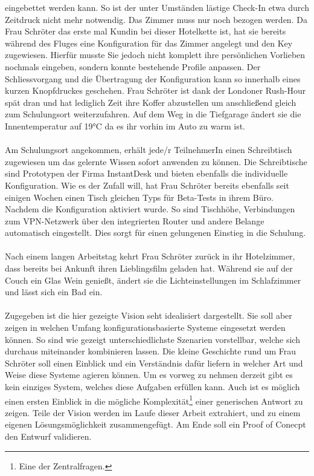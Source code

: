 eingebettet werden kann. So ist der unter Umständen lästige Check-In etwa durch Zeitdruck nicht mehr notwendig. Das Zimmer muss nur noch bezogen werden. Da Frau Schröter das
erste mal Kundin bei dieser Hotelkette ist, hat sie bereits während des Fluges eine Konfiguration für das Zimmer angelegt und den Key zugewiesen. Hierfür musste Sie jedoch 
nicht komplett ihre persönlichen Vorlieben nochmals eingeben, sondern konnte bestehende Profile anpassen. Der Schliessvorgang und die Übertragung der Konfiguration kann so 
innerhalb eines kurzen Knopfdruckes geschehen. Frau Schröter ist dank der Londoner Rush-Hour spät dran und hat lediglich Zeit ihre Koffer abzustellen um anschließend gleich
zum Schulungsort weiterzufahren. Auf dem Weg in die Tiefgarage ändert sie die Innentemperatur auf 19°C da es ihr vorhin im Auto zu warm ist. 
\\\\
Am Schulungsort angekommen, erhält jede/r TeilnehmerIn einen Schreibtisch zugewiesen um das gelernte Wissen sofort anwenden zu können. Die Schreibtische sind Prototypen der
Firma InstantDesk und bieten ebenfalls die individuelle Konfiguration. Wie es der Zufall will, hat Frau Schröter bereits ebenfalls seit einigen Wochen einen Tisch gleichen
Typs für Beta-Tests in ihrem Büro. Nachdem die Konfiguration aktiviert wurde. So sind Tischhöhe, Verbindungen zum VPN-Netzwerk über den integrierten Router und andere 
Belange automatisch eingestellt. Dies sorgt für einen gelungenen Einstieg in die Schulung. 
\\\\
Nach einem langen Arbeitstag kehrt Frau Schröter zurück in ihr Hotelzimmer, dass bereits bei Ankunft ihren Lieblingsfilm geladen hat. Während sie auf der Couch ein Glas Wein 
genießt, ändert sie die Lichteinstellungen im Schlafzimmer und lässt sich ein Bad ein. 
\\\\
Zugegeben ist die hier gezeigte Vision seht idealisiert dargestellt. Sie soll aber zeigen in welchen Umfang konfigurationsbasierte Systeme eingesetzt werden können. So sind 
wie gezeigt unterschiedlichste Szenarien vorstellbar, welche sich durchaus miteinander kombinieren lassen. Die kleine Geschichte rund um Frau Schröter soll einen Einblick und 
ein Verständnis dafür liefern in welcher Art und Weise diese Systeme agieren können.  
Um es vorweg zu nehmen derzeit gibt es kein einziges System, welches diese Aufgaben erfüllen kann. Auch ist es möglich einen ersten Einblick in die mögliche 
Komplexität\footnote{Eine der Zentralfragen.} einer generischen Antwort zu zeigen. 
Teile der Vision werden im Laufe dieser Arbeit extrahiert, und zu einem eigenen Lösungsmöglichkeit zusammengefügt. Am Ende soll ein Proof of Conecpt den Entwurf validieren. 

